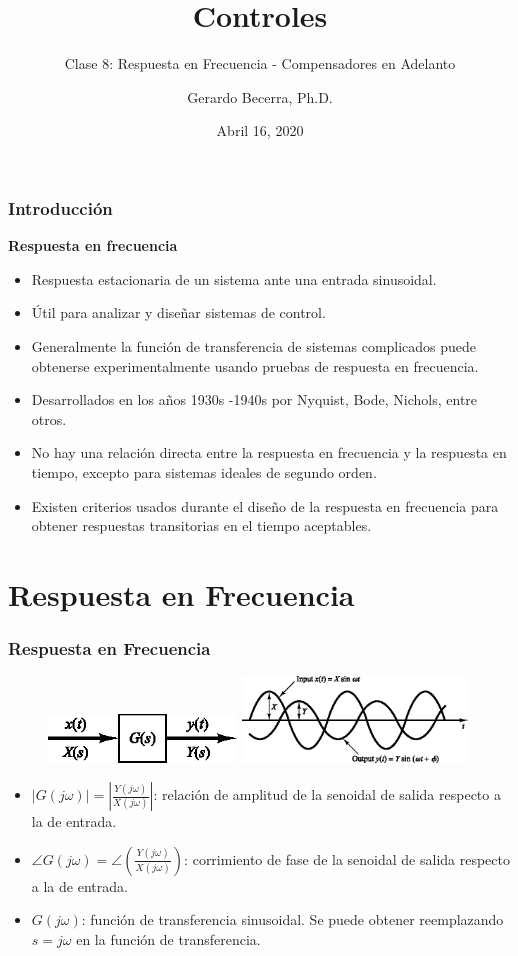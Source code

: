 \documentclass[aspectratio=169, handout]{beamer}
\title{Controles}
\subtitle{\small Clase 8: Respuesta en Frecuencia - Compensadores en Adelanto}
\author{Gerardo Becerra, Ph.D.}
\institute{Pontificia Universidad Javeriana\\ Departamento de Electrónica}
\date{Abril 16, 2020}
\theoremstyle{definition}
\theoremstyle{plain}
\theoremstyle{remark}
\begin{document}
\frame{\titlepage}	

\begin{frame}[<+->]\frametitle{Introducción}
\textbf{Respuesta en frecuencia}
\begin{itemize}
	\item Respuesta estacionaria de un sistema ante una entrada sinusoidal.
	\item Útil para analizar y diseñar sistemas de control.
	\item Generalmente la función de transferencia de sistemas complicados puede obtenerse experimentalmente usando pruebas de respuesta en frecuencia.
	\item Desarrollados en los años 1930s -1940s por Nyquist, Bode, Nichols, entre otros.
	\item No hay una relación directa entre la respuesta en frecuencia y la respuesta en tiempo, excepto para sistemas ideales de segundo orden.
	\item Existen criterios usados durante el diseño de la respuesta en frecuencia para obtener respuestas transitorias en el tiempo aceptables.
\end{itemize}
\end{frame}

\section{Respuesta en Frecuencia}
\begin{frame}[<+->]\frametitle{Respuesta en Frecuencia}
	\begin{figure}
		\includegraphics[width=5cm]{images/SLIT.eps}
		\hspace*{10mm}
		\includegraphics[width=6cm]{images/inputOutputSignals.eps}
	\end{figure}
	\pause
	\begin{itemize}
		\item $\left| G(j\omega) \right| = \left| \frac{Y(j\omega)}{X(j\omega)} \right|$: relación de amplitud de la senoidal de salida respecto a la de entrada.
		\item $\angle G(j\omega) = \angle \left(\frac{Y(j\omega)}{X(j\omega)} \right)$: corrimiento de fase de la senoidal de salida respecto a la de entrada.
		\item $G(j\omega)$: función de transferencia sinusoidal. Se puede obtener reemplazando $s = j\omega$ en la función de transferencia.
	\end{itemize}
\end{frame}
\end{document}
